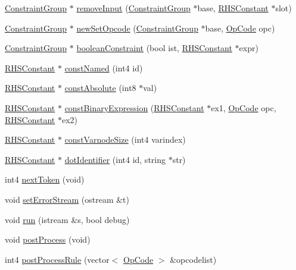 \begin{DoxyCompactItemize}
\mbox{\hyperlink{class_constraint_group}{Constraint\+Group}} $\ast$ \mbox{\hyperlink{class_rule_compile_a53a18194e1f9ee8d2fb24fcba183e8be}{remove\+Input}} (\mbox{\hyperlink{class_constraint_group}{Constraint\+Group}} $\ast$base, \mbox{\hyperlink{class_r_h_s_constant}{R\+H\+S\+Constant}} $\ast$slot)
\item 
\mbox{\hyperlink{class_constraint_group}{Constraint\+Group}} $\ast$ \mbox{\hyperlink{class_rule_compile_a0290843922cab1369f388010434b5e3e}{new\+Set\+Opcode}} (\mbox{\hyperlink{class_constraint_group}{Constraint\+Group}} $\ast$base, \mbox{\hyperlink{opcodes_8hh_abeb7dfb0e9e2b3114e240a405d046ea7}{Op\+Code}} opc)
\item 
\mbox{\hyperlink{class_constraint_group}{Constraint\+Group}} $\ast$ \mbox{\hyperlink{class_rule_compile_a4098cd7d4e0fa4af52720ccdace68b47}{boolean\+Constraint}} (bool ist, \mbox{\hyperlink{class_r_h_s_constant}{R\+H\+S\+Constant}} $\ast$expr)
\item 
\mbox{\hyperlink{class_r_h_s_constant}{R\+H\+S\+Constant}} $\ast$ \mbox{\hyperlink{class_rule_compile_af99400d6175cae9961d251db5d0d00d3}{const\+Named}} (int4 id)
\item 
\mbox{\hyperlink{class_r_h_s_constant}{R\+H\+S\+Constant}} $\ast$ \mbox{\hyperlink{class_rule_compile_aaf62e66036b0f83ed603279396bbfbd4}{const\+Absolute}} (int8 $\ast$val)
\item 
\mbox{\hyperlink{class_r_h_s_constant}{R\+H\+S\+Constant}} $\ast$ \mbox{\hyperlink{class_rule_compile_adade34d2e9ce838fc0e171791e5412d8}{const\+Binary\+Expression}} (\mbox{\hyperlink{class_r_h_s_constant}{R\+H\+S\+Constant}} $\ast$ex1, \mbox{\hyperlink{opcodes_8hh_abeb7dfb0e9e2b3114e240a405d046ea7}{Op\+Code}} opc, \mbox{\hyperlink{class_r_h_s_constant}{R\+H\+S\+Constant}} $\ast$ex2)
\item 
\mbox{\hyperlink{class_r_h_s_constant}{R\+H\+S\+Constant}} $\ast$ \mbox{\hyperlink{class_rule_compile_ad7d6091a6d7a959be5c715cb8a0b7458}{const\+Varnode\+Size}} (int4 varindex)
\item 
\mbox{\hyperlink{class_r_h_s_constant}{R\+H\+S\+Constant}} $\ast$ \mbox{\hyperlink{class_rule_compile_a64508b1420ade3674b744828f8774059}{dot\+Identifier}} (int4 id, string $\ast$str)
\item 
int4 \mbox{\hyperlink{class_rule_compile_a38d561337771aa620c8bb1fd26f3f12b}{next\+Token}} (void)
\item 
void \mbox{\hyperlink{class_rule_compile_a1dcd477a86a0d2d7d1d695124c929dae}{set\+Error\+Stream}} (ostream \&t)
\item 
void \mbox{\hyperlink{class_rule_compile_ae0d2eee31ed53f1364f3f26aae2c94b1}{run}} (istream \&s, bool debug)
\item 
void \mbox{\hyperlink{class_rule_compile_a7331ae343b99b61b6c11b8060c362a4e}{post\+Process}} (void)
\item 
int4 \mbox{\hyperlink{class_rule_compile_af9a583f4be2f91cf257b018c2e08b480}{post\+Process\+Rule}} (vector$<$ \mbox{\hyperlink{opcodes_8hh_abeb7dfb0e9e2b3114e240a405d046ea7}{Op\+Code}} $>$ \&opcodelist)
\end{DoxyCompactItemize}
